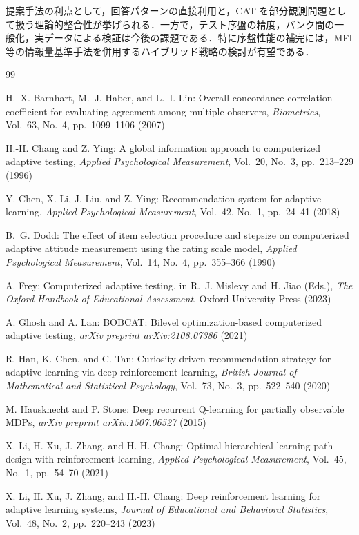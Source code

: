 \documentclass[dvipdfmx,a4j]{jarticle}
\begin{document}
提案手法の利点として，回答パターンの直接利用と，CAT を部分観測問題として扱う理論的整合性が挙げられる．一方で，テスト序盤の精度，バンク間の一般化，実データによる検証は今後の課題である．特に序盤性能の補完には，MFI 等の情報量基準手法を併用するハイブリッド戦略の検討が有望である．

\begin{thebibliography}{99}

H.~X. Barnhart, M.~J. Haber, and L.~I. Lin:
Overall concordance correlation coefficient for evaluating agreement among multiple observers,
\textit{Biometrics}, Vol.~63, No.~4, pp.~1099--1106 (2007)

H.-H. Chang and Z. Ying:
A global information approach to computerized adaptive testing,
\textit{Applied Psychological Measurement}, Vol.~20, No.~3, pp.~213--229 (1996)

Y. Chen, X. Li, J. Liu, and Z. Ying:
Recommendation system for adaptive learning,
\textit{Applied Psychological Measurement}, Vol.~42, No.~1, pp.~24--41 (2018)

B.~G. Dodd:
The effect of item selection procedure and stepsize on computerized adaptive attitude measurement using the rating scale model,
\textit{Applied Psychological Measurement}, Vol.~14, No.~4, pp.~355--366 (1990)

A. Frey:
Computerized adaptive testing,
in R.~J. Mislevy and H. Jiao (Eds.),
\textit{The Oxford Handbook of Educational Assessment},
Oxford University Press (2023)

A. Ghosh and A. Lan:
BOBCAT: Bilevel optimization-based computerized adaptive testing,
\textit{arXiv preprint arXiv:2108.07386} (2021)

R. Han, K. Chen, and C. Tan:
Curiosity-driven recommendation strategy for adaptive learning via deep reinforcement learning,
\textit{British Journal of Mathematical and Statistical Psychology},
Vol.~73, No.~3, pp.~522--540 (2020)

M. Hausknecht and P. Stone:
Deep recurrent Q-learning for partially observable MDPs,
\textit{arXiv preprint arXiv:1507.06527} (2015)

X. Li, H. Xu, J. Zhang, and H.-H. Chang:
Optimal hierarchical learning path design with reinforcement learning,
\textit{Applied Psychological Measurement}, Vol.~45, No.~1, pp.~54--70 (2021)

X. Li, H. Xu, J. Zhang, and H.-H. Chang:
Deep reinforcement learning for adaptive learning systems,
\textit{Journal of Educational and Behavioral Statistics},
Vol.~48, No.~2, pp.~220--243 (2023)


\end{thebibliography}
\end{document}
